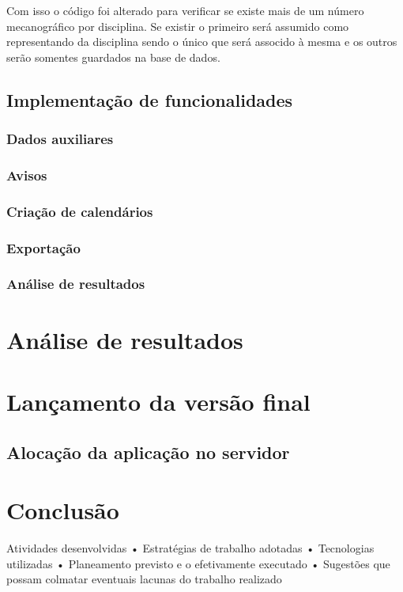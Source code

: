 \documentclass[12pt, twoside]{report}
\begin{document}
	Com isso o código foi alterado para verificar se existe mais de um número mecanográfico por disciplina. Se existir o primeiro será assumido como representando da disciplina sendo o único que será assocido à mesma e os outros serão somentes guardados na base de dados. 
	
	
	
	
	\section{Implementação de funcionalidades}
	\subsection{Dados auxiliares}
	\subsection{Avisos}
	\subsection{Criação de calendários}
	\subsection{Exportação}
	
	\subsection{Análise de resultados}
	
	
	
	\chapter{Análise de resultados}
	
	
	
	
	\chapter{Lançamento da versão final}
	
	\section{Alocação da aplicação no servidor}
	
	
	
	\chapter{Conclusão}
	
	Atividades desenvolvidas
	• Estratégias de trabalho adotadas
	• Tecnologias utilizadas
	• Planeamento previsto e o efetivamente executado
	• Sugestões que possam colmatar eventuais lacunas do
	trabalho realizado
	
	
	
	\pagestyle{empty}
	
	
\end{document}
